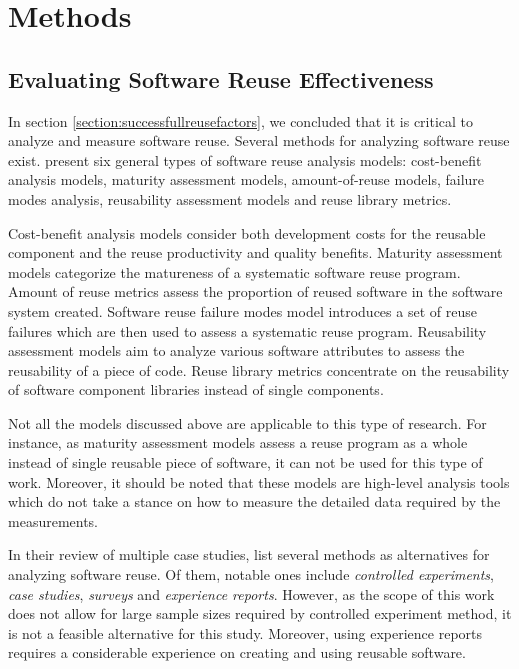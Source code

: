 
\chapter{Methods}
\label{chapter:methods}

\section{Evaluating Software Reuse Effectiveness}

In section \ref{section:successfullreusefactors}, we concluded that it is critical to analyze and measure software reuse. Several methods for analyzing software reuse exist. \citet{frakes_software_1996} present six general types of software reuse analysis models: cost-benefit analysis models, maturity assessment models, amount-of-reuse models, failure modes analysis, reusability assessment models and reuse library metrics. 

Cost-benefit analysis models consider both development costs for the reusable component and the reuse productivity and quality benefits. Maturity assessment models categorize the matureness of a systematic software reuse program. Amount of reuse metrics assess the proportion of reused software in the software system created. Software reuse failure modes model introduces a set of reuse failures which are then used to assess a systematic reuse program. Reusability assessment models aim to analyze various software attributes to assess the reusability of a piece of code. Reuse library metrics concentrate on the reusability of software component libraries instead of single components.

Not all the models discussed above are applicable to this type of research. For instance, as maturity assessment models assess a reuse program as a whole instead of single reusable piece of software, it can not be used for this type of work. Moreover, it should be noted that these models are high-level analysis tools which do not take a stance on how to measure the detailed data required by the measurements.

In their review of multiple case studies, \citet{mohagheghi_quality_2007} list several methods as alternatives for analyzing software reuse. Of them, notable ones include \emph{controlled experiments}, \emph{case studies}, \emph{surveys} and \emph{experience reports}. However, as the scope of this work does not allow for large sample sizes required by controlled experiment method, it is not a feasible alternative for this study. Moreover, using experience reports requires a considerable experience on creating and using reusable software.

